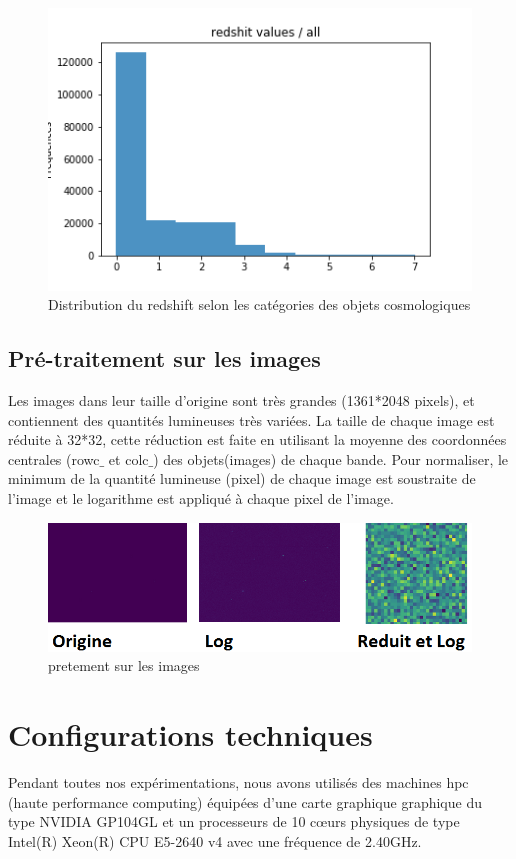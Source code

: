 \begin{figure}[H]
	\includegraphics[scale = 0.3]{images/all.png}
	\caption{Distribution du redshift selon les catégories des objets cosmologiques}%
\end{figure}

\subsection{Pré-traitement sur les images}
Les images dans leur taille d'origine sont très grandes (1361*2048 pixels), et contiennent des quantités lumineuses très variées.
La taille de chaque image est réduite à 32*32, cette réduction est faite en utilisant la moyenne des coordonnées centrales (rowc$\_$ et colc$\_$) des objets(images) de chaque bande. Pour normaliser, le minimum de la quantité lumineuse (pixel) de chaque image est soustraite de l'image et le logarithme est appliqué à chaque pixel de l'image.  


\begin{figure}[H]
    \centering
    \includegraphics[scale = 0.5]{images/pretaitemen.png}
    \caption{pretement sur les images}
\end{figure}

\section{Configurations techniques}
Pendant toutes nos expérimentations, nous avons utilisés des machines hpc (haute performance computing) équipées d'une carte graphique graphique du type  NVIDIA GP104GL et un processeurs de 10 cœurs physiques de type Intel(R) Xeon(R) CPU E5-2640 v4 avec une fréquence de 2.40GHz.

